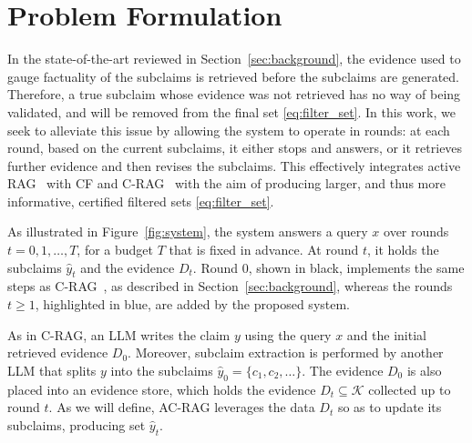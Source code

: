 \section{Problem Formulation}\label{sec:prob_form}



In the state-of-the-art reviewed in Section~\ref{sec:background}, the evidence used to gauge factuality of the subclaims is retrieved before the subclaims are generated. Therefore, a true subclaim whose evidence was not retrieved has no way of being validated, and will be removed from the final set \eqref{eq:filter_set}. In this work, we seek to alleviate this issue by allowing the system to operate in rounds: at each round, based on the current subclaims, it either stops and answers, or it retrieves further evidence and then revises the subclaims. This effectively integrates active RAG~\cite{jiang2023active,asai2024selfrag} with CF and C-RAG~\cite{mohri2024language,cherian2024large} with the aim of producing larger, and thus more informative, certified filtered sets \eqref{eq:filter_set}.

As illustrated in Figure~\ref{fig:system}, the system answers a query $x$ over rounds $t = 0, 1, \ldots, T$, for a budget $T$ that is fixed in advance. At round $t$, it holds the subclaims $\hat{y}_t$ and the evidence $D_t$. Round $0$, shown in black, implements the same steps as C-RAG~\cite{feng2025response}, as described in Section~\ref{sec:background}, whereas the rounds $t \geq 1$, highlighted in blue, are added by the proposed system.

As in C-RAG, an LLM writes the claim $y$ using the query $x$ and the initial retrieved evidence $D_0$. Moreover, subclaim extraction is performed by another LLM that splits $y$ into the subclaims $\hat{y}_0 = \{c_1, c_2, \ldots\}$. The evidence $D_0$ is also placed into an evidence store, which holds the evidence $D_t \subseteq \mathcal{K}$ collected up to round $t$. As we will define, AC-RAG leverages the data $D_t$ so as to update its subclaims, producing set $\hat{y}_t$.

